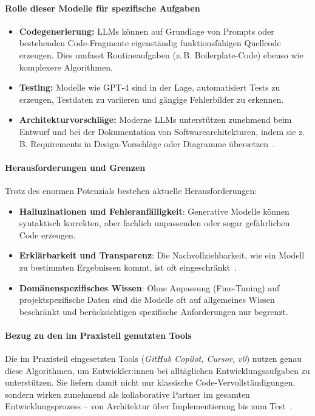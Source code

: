 \paragraph{Rolle dieser Modelle für spezifische Aufgaben}

\begin{itemize}
    \item \textbf{Codegenerierung:} LLMs können auf Grundlage von Prompts oder bestehenden Code-Fragmente eigenständig funktionsfähigen Quellcode erzeugen. Dies umfasst Routineaufgaben (z.\,B. Boilerplate-Code) ebenso wie komplexere Algorithmen.
    \item \textbf{Testing:} Modelle wie GPT-4 sind in der Lage, automatisiert Tests zu erzeugen, Testdaten zu variieren und gängige Fehlerbilder zu erkennen.
    \item \textbf{Architekturvorschläge:} Moderne LLMs unterstützen zunehmend beim Entwurf und bei der Dokumentation von Softwarearchitekturen, indem sie z.\,B. Requirements in Design-Vorschläge oder Diagramme übersetzen~\cite{esposito_generative_2025, nguyen-duc_generative_2023}.
\end{itemize}

\paragraph{Herausforderungen und Grenzen}

Trotz des enormen Potenzials bestehen aktuelle Herausforderungen:
\begin{itemize}
    \item \textbf{Halluzinationen und Fehleranfälligkeit}: Generative Modelle können syntaktisch korrekten, aber fachlich unpassenden oder sogar gefährlichen Code erzeugen.
    \item \textbf{Erklärbarkeit und Transparenz}: Die Nachvollziehbarkeit, wie ein Modell zu bestimmten Ergebnissen kommt, ist oft eingeschränkt~\cite{esposito_generative_2025, nguyen-duc_generative_2023}.
    \item \textbf{Domänenspezifisches Wissen}: Ohne Anpassung (Fine-Tuning) auf projektspezifische Daten sind die Modelle oft auf allgemeines Wissen beschränkt und berücksichtigen spezifische Anforderungen nur begrenzt.
\end{itemize}

\paragraph{Bezug zu den im Praxisteil genutzten Tools}

Die im Praxisteil eingesetzten Tools (\textit{GitHub Copilot, Cursor, v0})
nutzen genau diese Algorithmen, um Entwickler:innen bei alltäglichen
Entwicklungsaufgaben zu unterstützen. Sie liefern damit nicht nur klassische
Code-Vervollständigungen, sondern wirken zunehmend als kollaborative Partner im
gesamten Entwicklungsprozess – von Architektur über Implementierung bis zum
Test~\cite{esposito_generative_2025, nguyen-duc_generative_2023}.

